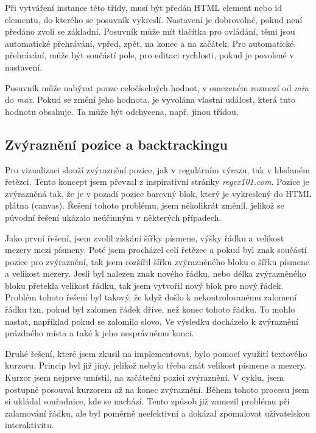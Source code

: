 Při vytváření instance této třídy, musí být předán HTML element nebo id elementu, do kterého se posuvník vykreslí.
Nastavení je dobrovolné, pokud není předáno zvolí se základní.
Posuvník může mít tlačítka pro ovládání, těmi jsou automatické přehrávání, vpřed, zpět, na konec a na začátek.
Pro automatické přehrávání, může být součástí pole, pro editaci rychlosti, pokud je povolené v nastavení.

Posuvník může nabývat pouze celočíselných hodnot, v omezeném rozmezí od \textit{min} do \textit{max}.
Pokud se změní jeho hodnota, je vyvolána vlastní událost, která tuto hodnotu obsahuje.
Ta může být odchycena, např. jinou třídou.

\subsection*{Zvýraznění pozice a backtrackingu}

Pro vizualizaci slouží zvýraznění pozice, jak v regulárním výrazu, tak v hledaném řetězci.
Tento koncept jsem převzal z inspirativní stránky \textit{regex101.com}.
Pozice je zvýrazněná tak, že je v pozadí pozice barevný blok, který je vykreslený do HTML plátna (canvas).
Řešení tohoto problému, jsem několikrát změnil, jelikož se původní řešení ukázalo neúčinným v některých případech.

Jako první řešení, jsem zvolil získání šířky písmene, výšky řádku a velikost mezery mezi písmeny.
Poté jsem procházel celí řetězec a pokud byl znak součástí pozice pro zvýraznění, tak jsem rozšířil šířku zvýrazněného bloku o šířku písmene a velikost mezery.
Jesli byl nalezen znak nového řádku, nebo délka zvýrazněného bloku přetekla velikost řádku, tak jsem vytvořil nový blok pro nový řádek.
Problém tohoto řešení byl takový, že když došlo k nekontrolovanému zalomení řádku tzn. pokud byl zalomen řádek dříve, než konec tohoto řádku.
To mohlo nastat, například pokud se zalomilo slovo.
Ve výsledku docházelo k zvýraznění prázdného místa a také k jeho nesprávnému konci.

Druhé řešení, které jsem zkusil na implementovat, bylo pomocí využití textového kurzoru.
Princip byl již jiný, jelikož nebylo třeba znát velikost písmene a mezery.
Kurzor jsem nejprve umístil, na začáteční pozici zvýraznění. 
V cyklu, jsem postupně posouval kurzorem až na konec zvýraznění.
Během tohoto procesu jsem si ukládal souřadnice, kde se nachází.
Tento způsob již zamezil problému při zalamování řádku, ale byl poměrně neefektivní a dokázal zpomalovat uživatelskou interaktivitu.

